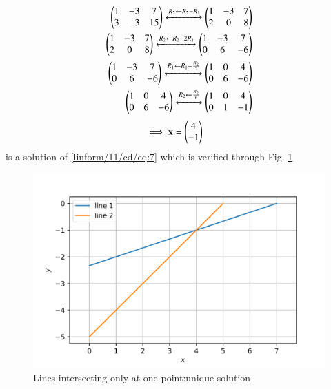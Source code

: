 \begin{align}
    \begin{pmatrix}1&-3&7\\3&-3&15\end{pmatrix}\xleftrightarrow{R_2\leftarrow R_2 -R_1}\begin{pmatrix}1&-3&7\\2&0&8\end{pmatrix} 
    \\ 
    \begin{pmatrix}1&-3&7\\2&0&8\end{pmatrix}\xleftrightarrow{R_2\leftarrow R_2 -2R_1}\begin{pmatrix}1&-3&7\\0&6&-6\end{pmatrix} 
    \\
    \begin{pmatrix}1&-3&7\\0&6&-6\end{pmatrix}\xleftrightarrow{R_1\leftarrow R_1 +\frac{R_2}{2}}\begin{pmatrix}1&0&4\\0&6&-6\end{pmatrix} 
\\ \begin{pmatrix}1&0&4\\0&6&-6\end{pmatrix}\xleftrightarrow{R_2\leftarrow\frac{R_2}{6}}\begin{pmatrix}1&0&4\\0&1&-1\end{pmatrix} \label{linform/11/cd/eq:11}\end{align} 
\begin{align}
 \implies \mathbf{x}&=\begin{pmatrix}4\\-1\end{pmatrix}
\end{align} is a solution of \ref{linform/11/cd/eq:7} which is verified through 
%
Fig. \ref{linform/11/cd/fig:2} 
%
\begin{figure}[!ht]
    \centering 
    \includegraphics[width= \columnwidth]{solutions/su2021/2/11/cd/assignment2d-1.png}
    \caption{Lines intersecting only at one point:unique solution}
    \label{linform/11/cd/fig:2}
\end{figure}
